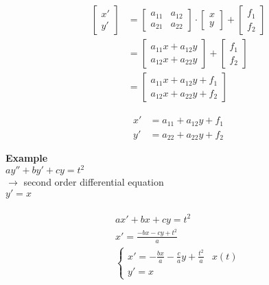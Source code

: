 \documentclass[10pt, letterpaper]{article}
\begin{document}
\begin{align*}
\begin{bmatrix}
	x'\\
	y'
\end{bmatrix}
&= \begin{bmatrix}
	a_{11} & a_{12}\\
	a_{21} & a_{22}
\end{bmatrix}
\cdot \begin{bmatrix}
	x\\
	y
\end{bmatrix}
+ \begin{bmatrix}
	f_1\\
	f_2
\end{bmatrix}\\
&= \begin{bmatrix}
	a_{11}x+a_{12}y\\
	a_{12}x+a_{22}y
\end{bmatrix}
+ \begin{bmatrix}
	f_1\\
	f_2
\end{bmatrix}\\
&= \begin{bmatrix}
	a_{11}x+a_{12}y+f_1\\
	a_{12}x+a_{22}y+f_2
\end{bmatrix}
\end{align*}

\begin{align*}
x' &= a_{11}+a_{12}y+f_1\\
y' &= a_{22}+a_{22}y+f_2
\end{align*}

\noindent\textbf{Example}\\
$ay''+by'+cy=t^2$\\
$\rightarrow$ second order differential equation\\
$y'=x$\\
\\
\begin{align*}
ax'+bx+cy=t^2\\
x'=\frac{-bx-cy+t^2}{a}\\
\begin{cases}
	x'=-\frac{bx}{a}-\frac{c}{a}y+\frac{t^2}{a} & x(t)\\
	y'=x
\end{cases}
\end{align*}
\end{document}
